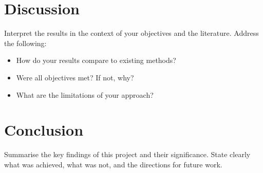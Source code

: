 \section{Discussion}
\label{sec:discussion}

Interpret the results in the context of your objectives and the
literature. Address the following:

\begin{itemize}
  \item How do your results compare to existing methods?
  \item Were all objectives met? If not, why?
  \item What are the limitations of your approach?
\end{itemize}

\section{Conclusion}
\label{sec:conclusion}

Summarise the key findings of this project and their significance.
State clearly what was achieved, what was not, and the directions for
future work.
